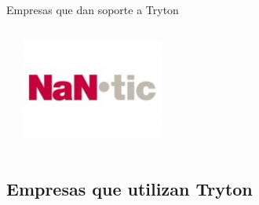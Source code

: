 \begin{frame}{Empresas que dan soporte a Tryton}
\begin{columns}
\begin{center}
            \end{center}
            \vspace*{-0.5cm}
            \begin{center}
            \includegraphics[width=0.8\textwidth]{./Images/NaNtic.JPG}
            \end{center}
        \end{columns}
    \end{frame}

    \subsection{Empresas que utilizan Tryton}


